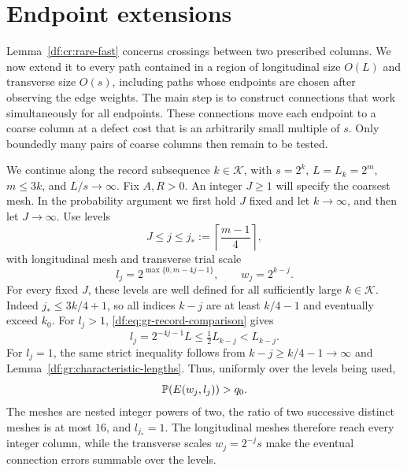 \section{Endpoint extensions}\label{df:sec:grids}

Lemma~\ref{df:cr:rare-fast} concerns crossings between two prescribed
columns. We now extend it to every path contained in a region of
longitudinal size $O(L)$ and transverse size $O(s)$, including paths
whose endpoints are chosen after observing the edge weights. The main
step is to construct connections that work simultaneously for all
endpoints. These connections move each endpoint to a coarse column at
a defect cost that is an arbitrarily small multiple of $s$. Only
boundedly many pairs of coarse columns then remain to be tested.

We continue along the record subsequence $k\in\mathcal K$, with
$s=2^k$, $L=L_k=2^m$, $m\le3k$, and $L/s\to\infty$. Fix $A,R>0$.
An integer $J\ge1$ will specify the coarsest mesh. In the probability
argument we first hold $J$ fixed and let $k\to\infty$, and then let
$J\to\infty$. Use levels
\[
 J\leq j\leq j_*:=\left\lceil\frac{m-1}{4}\right\rceil,
\]
with longitudinal mesh and transverse trial scale
\begin{equation}\label{df:eq:gr-meshes}
 l_j=2^{\max\{0,m-4j-1\}},\qquad w_j=2^{k-j}.
\end{equation}
For every fixed $J$, these levels are well defined for all sufficiently
large $k\in\mathcal K$. Indeed $j_*\leq3k/4+1$, so all indices $k-j$
are at least $k/4-1$ and eventually exceed $k_0$. For $l_j>1$,
\eqref{df:eq:gr-record-comparison} gives
\[
 l_j=2^{-4j-1}L\leq\tfrac12L_{k-j}<L_{k-j}.
\]
For $l_j=1$, the same strict inequality follows from
$k-j\geq k/4-1\to\infty$ and
Lemma~\ref{df:gr:characteristic-lengths}. Thus, uniformly over the levels
being used,
\begin{equation}\label{df:eq:gr-trial-probability}
 \mathbb P(E(w_j,l_j))>q_0.
\end{equation}
The meshes are nested integer powers of two, the ratio of two
successive distinct meshes is at most $16$, and $l_{j_*}=1$.
The longitudinal meshes therefore reach every integer column, while
the transverse scales $w_j=2^{-j}s$ make the eventual connection
errors summable over the levels.


